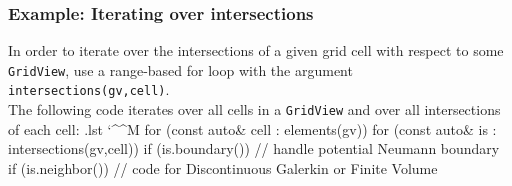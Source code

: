 \documentclass[ignorenonframetext,11pt]{beamer}
\makeatletter
\theoremstyle{definition}
\newenvironment{codeblock}{%
  \begin{tcolorbox}[size=small,oversize,boxrule=0pt,colframe=white]}{%
  \end{tcolorbox}}
\newenvironment{cppcode}{%
  \begingroup
  \@bsphack
  \immediate\openout\lstvrb@out\jobname.lst
  \let\do\@makeother\dospecials\catcode`\^^M\active
  \def\verbatim@processline{%
    \immediate\write\lstvrb@out{\the\verbatim@line}}%
  \verbatim@start}{%
  \immediate\closeout\lstvrb@out
  \@esphack
  \endgroup
  \begin{codeblock}
    
  \end{codeblock}}
\makeatother
\begin{document}
\begin{frame}[fragile]
\begin{columns}
\begin{column}{0.25\linewidth}
\begin{center}
      \end{center}
    \end{column}
  \end{columns}

\end{frame}



\begin{frame}[fragile] \frametitle{Example: Iterating over intersections}
In order to iterate over the intersections of a given grid cell with respect to some
\lstinline!GridView!, use a range-based for loop with the argument \lstinline!intersections(gv,cell)!.\\[.5em]
The following code iterates over all cells in a \lstinline!GridView! and over all intersections of each cell:
\begin{cppcode}
for (const auto& cell : elements(gv))
  for (const auto& is : intersections(gv,cell)) {
    if (is.boundary()) {
      // handle potential Neumann boundary
    }
    if (is.neighbor()) {
      // code for Discontinuous Galerkin or Finite Volume
    }
  }
\end{cppcode}
\end{frame}

%   





\end{document}

